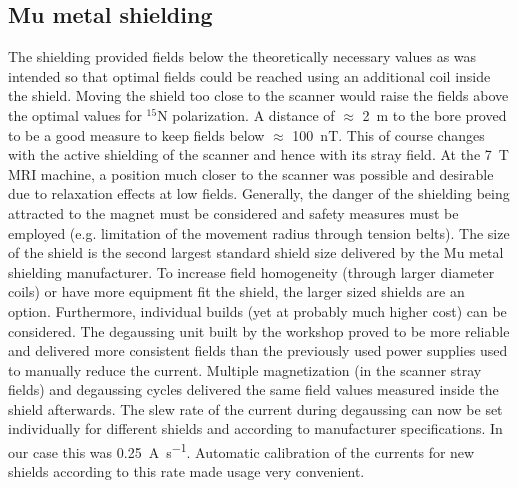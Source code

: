         \subsection{Mu metal shielding}
            The shielding provided fields below the theoretically necessary values as was intended so that optimal fields could be reached using an additional coil inside the shield. Moving the shield too close to the scanner would raise the fields above the optimal values for $^{15}$N polarization. A distance of $\approx$ \SI{2}{\meter} to the bore proved to be a good measure to keep fields below $\approx$ \SI{100}{\nano\tesla}. This of course changes with the active shielding of the scanner and hence with its stray field. At the \SI{7}{\tesla} MRI machine, a position much closer to the scanner was possible and desirable due to relaxation effects at low fields. Generally, the danger of the shielding being attracted to the magnet must be considered and safety measures must be employed (e.g. limitation of the movement radius through tension belts). The size of the shield is the second largest standard shield size delivered by the Mu metal shielding manufacturer. To increase field homogeneity (through larger diameter coils) or have more equipment fit the shield, the larger sized shields are an option. Furthermore, individual builds (yet at probably much higher cost) can be considered.
            The degaussing unit built by the workshop proved to be more reliable and delivered more consistent fields than the previously used power supplies used to manually reduce the current. Multiple magnetization (in the scanner stray fields) and degaussing cycles delivered the same field values measured inside the shield afterwards. The slew rate of the current during degaussing can now be set individually for different shields and according to manufacturer specifications. In our case this was \SI{0.25}{\ampere\per\second}. Automatic calibration of the currents for new shields according to this rate made usage very convenient.
